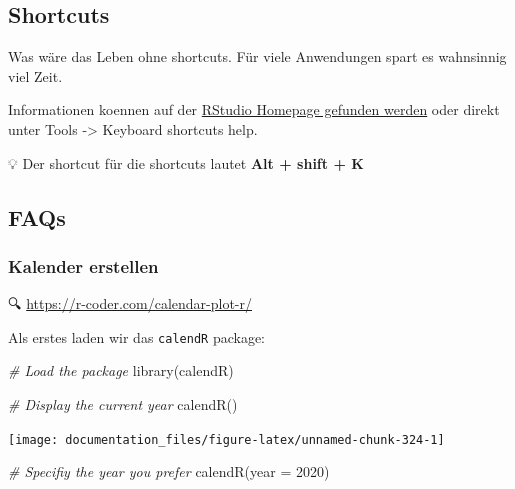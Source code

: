 \documentclass[
]{article}
\newenvironment{Shaded}{\begin{snugshade}}{\end{snugshade}}
\newcommand{\AttributeTok}[1]{\textcolor[rgb]{0.77,0.63,0.00}{#1}}
\newcommand{\CommentTok}[1]{\textcolor[rgb]{0.56,0.35,0.01}{\textit{#1}}}
\newcommand{\DecValTok}[1]{\textcolor[rgb]{0.00,0.00,0.81}{#1}}
\newcommand{\FunctionTok}[1]{\textcolor[rgb]{0.00,0.00,0.00}{#1}}
\newcommand{\NormalTok}[1]{#1}
\begin{document}
\hypertarget{shortcuts}{%
\subsection{Shortcuts}\label{shortcuts}}

Was wäre das Leben ohne shortcuts. Für viele Anwendungen spart es wahnsinnig viel Zeit.

Informationen koennen auf der \href{https://support.rstudio.com/hc/en-us/articles/200711853-Keyboard-Shortcuts}{RStudio Homepage gefunden werden} oder direkt unter Tools -\textgreater{} Keyboard shortcuts help.

💡 Der shortcut für die shortcuts lautet \textbf{Alt + shift + K}

\hypertarget{faqs}{%
\subsection{FAQs}\label{faqs}}

\hypertarget{kalender-erstellen}{%
\subsubsection{Kalender erstellen}\label{kalender-erstellen}}

🔍 \url{https://r-coder.com/calendar-plot-r/}

Als erstes laden wir das \texttt{calendR} package:

\begin{Shaded}
\begin{Highlighting}[]
\CommentTok{\# Load the package}
\FunctionTok{library}\NormalTok{(calendR)}

\CommentTok{\# Display the current year}
\FunctionTok{calendR}\NormalTok{()}
\end{Highlighting}
\end{Shaded}

\begin{center}\texttt{[image: documentation\_files/figure-latex/unnamed-chunk-324-1]} \end{center}

\begin{Shaded}
\begin{Highlighting}[]

\CommentTok{\# Specifiy the year you prefer}
\FunctionTok{calendR}\NormalTok{(}\AttributeTok{year =} \DecValTok{2020}\NormalTok{)}
\end{Highlighting}
\end{Shaded}
\end{document}
